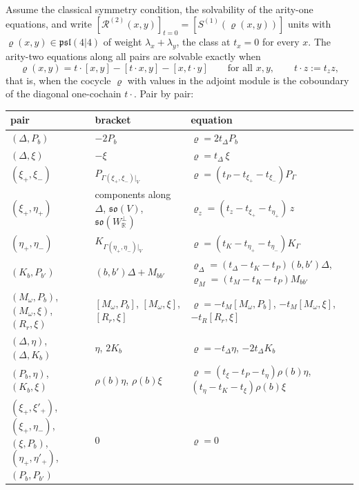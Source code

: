 \begin{theorem}
\label{thm:c12-fix}
Assume the classical symmetry condition, the solvability of the arity-one equations, and write $[\mathcal R^{(2)}(x,y)]_{t=0}=[S^{(1)}(\varrho(x,y))]$ units with $\varrho(x,y)\in\mathfrak{psl}(4|4)$ of weight $\lambda_x+\lambda_y$, the class at $t_x=0$ for every $x$. The arity-two equations along all pairs are solvable exactly when
\begin{equation}
\varrho(x,y)=t\cdot[x,y]-[t\cdot x,y]-[x,t\cdot y]\qquad\text{for all }x,y,\qquad t\cdot z:=t_zz,
\label{eq:c12-rho}
\end{equation}
that is, when the cocycle $\varrho$ with values in the adjoint module is the coboundary of the diagonal one-cochain $t\cdot$. Pair by pair:

\begin{tabular}{l|l|l}
pair & bracket & equation\\
\hline
$(\Delta,P_b)$ & $-2P_b$ & $\varrho=2t_\Delta P_b$\\
$(\Delta,\xi)$ & $-\xi$ & $\varrho=t_\Delta\,\xi$\\
$(\xi_+,\xi_-)$ & $P_{\Gamma(\xi_+,\xi_-)|_V}$ & $\varrho=(t_P-t_{\xi_+}-t_{\xi_-})P_{\Gamma}$\\
$(\xi_+,\eta_+)$ & components along $\Delta$, $\mathfrak{so}(V)$, $\mathfrak{so}(W_{\mathbb R}^\perp)$ & $\varrho_z=(t_z-t_{\xi_+}-t_{\eta_+})\,z$\\
$(\eta_+,\eta_-)$ & $K_{\Gamma(\eta_+,\eta_-)|_V}$ & $\varrho=(t_K-t_{\eta_+}-t_{\eta_-})K_{\Gamma}$\\
$(K_b,P_{b'})$ & $(b,b')\Delta+M_{bb'}$ & $\varrho_\Delta=(t_\Delta-t_K-t_P)(b,b')\Delta$, $\varrho_M=(t_M-t_K-t_P)M_{bb'}$\\
$(M_\omega,P_b)$, $(M_\omega,\xi)$, $(R_r,\xi)$ & $[M_\omega,P_b]$, $[M_\omega,\xi]$, $[R_r,\xi]$ & $\varrho=-t_M[M_\omega,P_b]$, $-t_M[M_\omega,\xi]$, $-t_R[R_r,\xi]$\\
$(\Delta,\eta)$, $(\Delta,K_b)$ & $\eta$, $2K_b$ & $\varrho=-t_\Delta\eta$, $-2t_\Delta K_b$\\
$(P_b,\eta)$, $(K_b,\xi)$ & $\rho(b)\eta$, $\rho(b)\xi$ & $\varrho=(t_\xi-t_P-t_\eta)\rho(b)\eta$, $(t_\eta-t_K-t_\xi)\rho(b)\xi$\\
$(\xi_+,\xi'_+)$, $(\xi_+,\eta_-)$, $(\xi,P_b)$, $(\eta_+,\eta'_+)$, $(P_b,P_{b'})$ & $0$ & $\varrho=0$\\
\end{tabular}


\end{theorem}
